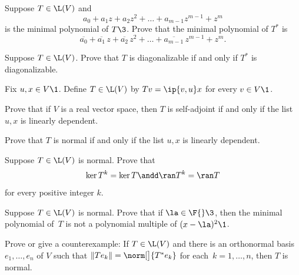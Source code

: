 \exercise
Suppose $T \in \L(V)$ and\label{7minpoly}
\[
a_0 + a_1 z + a_2 z^2 + \dots + a_{m-1} z^{m-1} + z^m
\]
is the minimal polynomial of $T\3$. Prove that the minimal polynomial of $T^*$ is
\[
\overline{a_0} + \overline{a_1}\, z + \overline{a_2} \,z^2 + \dots + \overline{a_{m-1}} \,z^{m-1} + z^m\!.
\]
\exercisedisplayend
{}


\exercise
Suppose $T \in \L(V)$. Prove that $T$ is diagonalizable if and only if $T^*$ is diagonalizable.


\exercise
Fix $u, x \in V\1$. Define $T \in \L(V)$ by
$
Tv = \ip{v, u}x$
for every $v \in V\1$.
\begin{subtheorem}
\item
Prove that if $V$ is a real vector space, then $T$ is self-adjoint if and only if the list $u, x$ is linearly dependent.
\item
Prove that $T$ is normal if and only if the list $u, x$ is linearly dependent.
\end{subtheorem}
\exercisesubtheoremend


\exercise
Suppose $T\in \L(V)$ is normal. Prove that \label{399}
\[
\ker T^k = \ker T \andd \ran T^k = \ran T
\]
for every positive integer $k$.


\exercise
Suppose $T \in \L(V)$ is normal. Prove that if $\la \in \F{}\3$, then the minimal polynomial of~$T$ is not a polynomial multiple of $(x-\la)^2\1$.

\exercise
Prove or give a counterexample: If $T \in \L(V)$ and there is an orthonormal basis $e_1, \dots, e_n$ of $V$ such that
$\|Te_k\| = \norm[\big]{T^* e_k}$ for each~$k= 1, \ldots, n$, then $T$ is normal.

